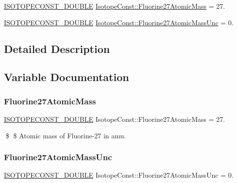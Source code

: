 \begin{DoxyCompactItemize}
\item 
\mbox{\hyperlink{group___isotope_const-_macros_ga8f45a7272ce02c0b4c65c44636ed719a}{I\+S\+O\+T\+O\+P\+E\+C\+O\+N\+S\+T\+\_\+\+D\+O\+U\+B\+LE}} \mbox{\hyperlink{group___isotope_const-_fluorine-_f27_gaa380e4f0615b33732bd9dd0b0088b1c1}{Isotope\+Const\+::\+Fluorine27\+Atomic\+Mass}} = 27.
\item 
\mbox{\hyperlink{group___isotope_const-_macros_ga8f45a7272ce02c0b4c65c44636ed719a}{I\+S\+O\+T\+O\+P\+E\+C\+O\+N\+S\+T\+\_\+\+D\+O\+U\+B\+LE}} \mbox{\hyperlink{group___isotope_const-_fluorine-_f27_ga935298e57f5cb8acb070eed9933671c3}{Isotope\+Const\+::\+Fluorine27\+Atomic\+Mass\+Unc}} = 0.
\end{DoxyCompactItemize}


\subsection{Detailed Description}


\subsection{Variable Documentation}
\mbox{\label{group___isotope_const-_fluorine-_f27_gaa380e4f0615b33732bd9dd0b0088b1c1}} 
\subsubsection{\texorpdfstring{Fluorine27\+Atomic\+Mass}{Fluorine27AtomicMass}}
{\footnotesize\ttfamily \mbox{\hyperlink{group___isotope_const-_macros_ga8f45a7272ce02c0b4c65c44636ed719a}{I\+S\+O\+T\+O\+P\+E\+C\+O\+N\+S\+T\+\_\+\+D\+O\+U\+B\+LE}} Isotope\+Const\+::\+Fluorine27\+Atomic\+Mass = 27.}

\$ \$ Atomic mass of Fluorine-\/27 in amu. \mbox{\label{group___isotope_const-_fluorine-_f27_ga935298e57f5cb8acb070eed9933671c3}} 
\subsubsection{\texorpdfstring{Fluorine27\+Atomic\+Mass\+Unc}{Fluorine27AtomicMassUnc}}
{\footnotesize\ttfamily \mbox{\hyperlink{group___isotope_const-_macros_ga8f45a7272ce02c0b4c65c44636ed719a}{I\+S\+O\+T\+O\+P\+E\+C\+O\+N\+S\+T\+\_\+\+D\+O\+U\+B\+LE}} Isotope\+Const\+::\+Fluorine27\+Atomic\+Mass\+Unc = 0.}

